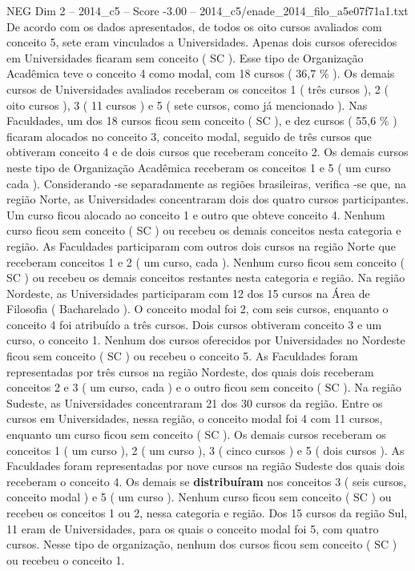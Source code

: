 \begin{textsample}{NEG Dim 2 – 2014\_c5 – Score -3.00 – 2014\_c5/enade\_2014\_filo\_a5e07f71a1.txt}
De acordo com os dados apresentados, de todos os oito cursos avaliados com conceito 5, sete eram vinculados a Universidades.
Apenas dois cursos oferecidos em Universidades ficaram sem conceito ( SC ).
Esse tipo de Organização Acadêmica teve o conceito 4 como modal, com 18 cursos ( 36,7 \% ).
Os demais cursos de Universidades avaliados receberam os conceitos 1 ( três cursos ), 2 ( oito cursos ), 3 ( 11 cursos ) e 5 ( sete cursos, como já mencionado ).
Nas Faculdades, um dos 18 cursos ficou sem conceito ( SC ), e dez cursos ( 55,6 \% ) ficaram alocados no conceito 3, conceito modal, seguido de três cursos que obtiveram conceito 4 e de dois cursos que receberam conceito 2.
Os demais cursos neste tipo de Organização Acadêmica receberam os conceitos 1 e 5 ( um curso cada ).
Considerando -se separadamente as regiões brasileiras, verifica -se que, na região Norte, as Universidades concentraram dois dos quatro cursos participantes.
Um curso ficou alocado ao conceito 1 e outro que obteve conceito 4.
Nenhum curso ficou sem conceito ( SC ) ou recebeu os demais conceitos nesta categoria e região.
As Faculdades participaram com outros dois cursos na região Norte que receberam conceitos 1 e 2 ( um curso, cada ).
Nenhum curso ficou sem conceito ( SC ) ou recebeu os demais conceitos restantes nesta categoria e região.
Na região Nordeste, as Universidades participaram com 12 dos 15 cursos na Área de Filosofia ( Bacharelado ).
O conceito modal foi 2, com seis cursos, enquanto o conceito 4 foi atribuído a três cursos.
Dois cursos obtiveram conceito 3 e um curso, o conceito 1.
Nenhum dos cursos oferecidos por Universidades no Nordeste ficou sem conceito ( SC ) ou recebeu o conceito 5.
As Faculdades foram representadas por três cursos na região Nordeste, dos quais dois receberam conceitos 2 e 3 ( um curso, cada ) e o outro ficou sem conceito ( SC ).
Na região Sudeste, as Universidades concentraram 21 dos 30 cursos da região.
Entre os cursos em Universidades, nessa região, o conceito modal foi 4 com 11 cursos, enquanto um curso ficou sem conceito ( SC ).
Os demais cursos receberam os conceitos 1 ( um curso ), 2 ( um curso ), 3 ( cinco cursos ) e 5 ( dois cursos ).
As Faculdades foram representadas por nove cursos na região Sudeste dos quais dois receberam o conceito 4.
Os demais se \textbf{distribuíram} nos conceitos 3 ( seis cursos, conceito modal ) e 5 ( um curso ).
Nenhum curso ficou sem conceito ( SC ) ou recebeu os conceitos 1 ou 2, nessa categoria e região.
Dos 15 cursos da região Sul, 11 eram de Universidades, para os quais o conceito modal foi 5, com quatro cursos.
Nesse tipo de organização, nenhum dos cursos ficou sem conceito ( SC ) ou recebeu o conceito 1.

\end{textsample}
